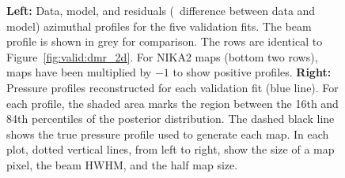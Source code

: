 \begin{figure}[t]
    \caption{
        \textbf{Left:} Data, model, and residuals (\ie\ difference between data and model) azimuthal profiles for the five validation fits.
        The beam profile is shown in grey for comparison.
        The rows are identical to Figure~\ref{fig:valid:dmr_2d}.
        For NIKA2 maps (bottom two rows), maps have been multiplied by $-1$ to show positive profiles.
        \textbf{Right:} Pressure profiles reconstructed for each validation fit (blue line).
        For each profile, the shaded area marks the region between the 16th and 84th percentiles of the posterior distribution.
        The dashed black line shows the true pressure profile used to generate each map.
        In each plot, dotted vertical lines, from left to right, show the size of a map pixel, the beam HWHM, and the half map size.
    }
    \label{fig:valid:profiles}
\end{figure}
